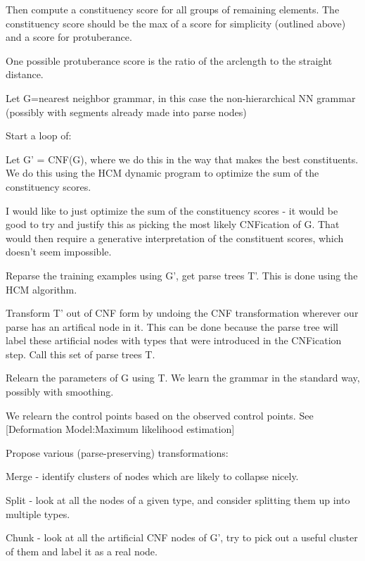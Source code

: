 \documentclass{article}
\begin{document}
\item Then compute a constituency score for all groups of remaining
  elements. The constituency score should be the max of a score for
  simplicity (outlined above) and a score for protuberance.

  One possible protuberance score is the ratio of the arclength to the
  straight distance.

\item Let G=nearest neighbor grammar, in this case the
  non-hierarchical NN grammar (possibly with segments already made
  into parse nodes)

\item Start a loop of:
\benum
\item Let G' = CNF(G), where we do this in the way that makes the best
  constituents. We do this using the HCM dynamic program to optimize
  the sum of the constituency scores.

  I would like to just optimize the sum of the constituency scores -
  it would be good to try and justify this as picking the most likely
  CNFication of G. That would then require a generative interpretation
  of the constituent scores, which doesn't seem impossible.

\item Reparse the training examples using G', get parse trees T'. This
  is done using the HCM algorithm. 

\item Transform T' out of CNF form by undoing the CNF transformation
  wherever our parse has an artifical node in it. This can be done
  because the parse tree will label these artificial nodes with types
  that were introduced in the CNFication step. Call this set of parse
  trees T.

\item Relearn the parameters of G using T. We learn the grammar in the
  standard way, possibly with smoothing. 

  We relearn the control points based on the observed control points.
  See [Deformation Model:Maximum likelihood estimation]

\item Propose various (parse-preserving) transformations:
\bitem
\item Merge - identify clusters of nodes which are likely to collapse
  nicely.
\item Split - look at all the nodes of a given type, and consider
  splitting them up into multiple types.
\item Chunk - look at all the artificial CNF nodes of G', try to pick
  out a useful cluster of them and label it as a real node. 
 \eitem
\end{document}
